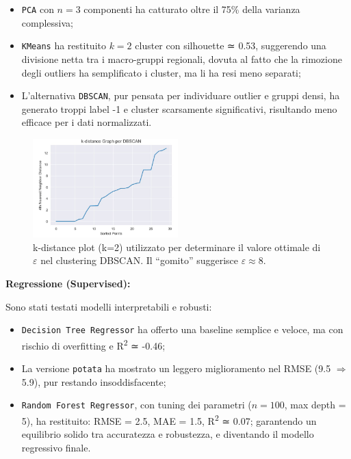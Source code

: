 \documentclass[conference]{IEEEtran}
\begin{document}
\begin{itemize} 
\item \texttt{PCA} con $n = 3$ componenti ha catturato oltre il 75\% della varianza complessiva; 
\item \texttt{KMeans} ha restituito $k = 2$ cluster con silhouette ≃ 0.53, suggerendo una divisione netta tra i macro-gruppi regionali, dovuta al fatto che la rimozione degli outliers ha semplificato i cluster, ma li ha resi meno separati; 
\item L’alternativa \texttt{DBSCAN}, pur pensata per individuare outlier e gruppi densi, ha generato troppi label -1 e cluster scarsamente significativi, risultando meno efficace per i dati normalizzati. 
\end{itemize}
\begin{figure}[H]
\centering
\includegraphics[width=0.5\textwidth]{k-distance-DBSCAN.png}
\caption{k-distance plot (k=2) utilizzato per determinare il valore ottimale di $\varepsilon$ nel clustering DBSCAN. Il “gomito” suggerisce $\varepsilon \approx 8$.}
\label{fig:dbscan-kdistance}
\end{figure}

\vspace{0.5em} \noindent\textbf{Regressione (Supervised):} 

Sono stati testati modelli interpretabili e robusti:

\begin{itemize} 
\item \texttt{Decision Tree Regressor} ha offerto una baseline semplice e veloce, ma con rischio di overfitting e R\textsuperscript{2} ≃ -0.46; 
\item La versione \texttt{potata} ha mostrato un leggero miglioramento nel RMSE (9.5 $\Rightarrow$ 5.9), pur restando insoddisfacente; 
\item \texttt{Random Forest Regressor}, con tuning dei parametri ($n = 100$, max depth = 5), ha restituito: RMSE = 2.5, MAE = 1.5, R\textsuperscript{2} ≃ 0.07; garantendo un equilibrio solido tra accuratezza e robustezza, e diventando il modello regressivo finale. 
\end{itemize}
\end{document}
